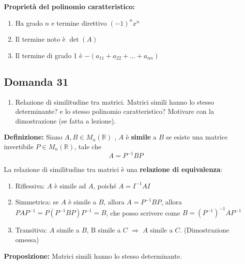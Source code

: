 \documentclass[
  a4paper,
]{article}
\providecommand{\tightlist}{%
  \setlength{\itemsep}{0pt}\setlength{\parskip}{0pt}}
\providecommand{\tightlist}{}
\begin{document}
\bigskip

\textbf{Proprietà del polinomio caratteristico:}

\begin{enumerate}
\def\labelenumi{\arabic{enumi}.}
\tightlist
\item
  Ha grado \(n\) e termine direttivo \((-1)^n x^n\)
\item
  Il termine noto è \(\det(A)\)
\item
  Il termine di grado 1 è \(-(a_{11} + a_{22} + ... + a_{nn})\)
\end{enumerate}

\hypertarget{domanda-31}{%
\subsection{Domanda 31}\label{domanda-31}}

\begin{observationbox}[Domanda]
\begin{enumerate}
\def\labelenumi{\arabic{enumi}.}
\setcounter{enumi}{30}
\tightlist
\item
  Relazione di similitudine tra matrici. Matrici simili hanno lo stesso
  determinante? e lo stesso polinomio caratteristico? Motivare con la
  dimostrazione (se fatta a lezione).
\end{enumerate}
\end{observationbox}

\textbf{Definizione:} Siano \(A, B \in M_n(\mathbb{R})\) , \(A\) è
\textbf{simile} a \(B\) se esiste una matrice invertibile
\(P \in M_n(\mathbb{R})\), tale che \[
A = P^{-1}BP
\]

La relazione di similitudine tra matrici è una \textbf{relazione di
equivalenza}:

\begin{enumerate}
\def\labelenumi{\arabic{enumi}.}
\tightlist
\item
  Riflessiva: \(A\) è simile ad \(A\), poiché \(A = I^{-1}AI\)
\item
  Simmetrica: se \(A\) è simile a \(B\), allora \(A = P^{-1}BP\), allora
  \(PAP^{-1} = P(P^{-1}BP)P^{-1} = B\), che posso scrivere come
  \(B = (P^{-1})^{-1}AP^{-1}\)
\item
  Transitiva: \(A\) simile a \(B\), B simile a \(C\) \(\Rightarrow\)
  \(A\) simile a \(C\). (Dimostrazione omessa)
\end{enumerate}

\textbf{Proposizione:} Matrici simili hanno lo stesso determinante.
\end{document}
